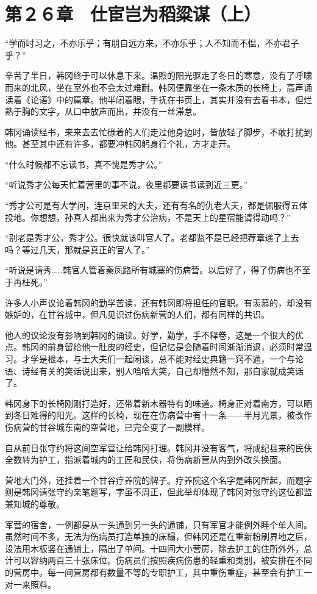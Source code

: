 \section{第２６章　仕宦岂为稻粱谋（上）}

“学而时习之，不亦乐乎；有朋自远方来，不亦乐乎；人不知而不愠，不亦君子乎？”

辛苦了半日，韩冈终于可以休息下来。温煦的阳光驱走了冬日的寒意，没有了呼啸而来的北风，坐在室外也不会太过难耐。韩冈便靠坐在一条木质的长椅上，高声诵读着《论语》中的篇章。他半闭着眼，手抚在书页上，其实并没有去看书本，但烂熟于胸的文字，从口中放声而出，并没有一丝滞怠。

韩冈诵读经书，来来去去忙碌着的人们走过他身边时，皆放轻了脚步，不敢打扰到他。甚至其中还有许多，都要冲韩冈躬身行个礼，方才走开。

“什么时候都不忘读书，真不愧是秀才公。”

“听说秀才公每天忙着营里的事不说，夜里都要读书读到近三更。”

“秀才公可是有大学问，连京里来的大夫，还有有名的仇老大夫，都是佩服得五体投地。你想想，孙真人都出来为秀才公治病，不是天上的星宿能请得动吗？”

“别老是秀才公，秀才公。很快就该叫官人了。老都监不是已经把荐章递了上去吗？等过几天，那就是真正的官人了。”

“听说是请秀……韩官人管着秦凤路所有城寨的伤病营。以后好了，得了伤病也不至于再枉死。”

许多人小声议论着韩冈的勤学苦读，还有韩冈即将担任的官职。有羡慕的，却没有嫉妒的，在甘谷城中，但凡见识过伤病新营的人们，都有同样的共识。

他人的议论没有影响到韩冈的诵读。好学，勤学，手不释卷，这是一个很大的优点。韩冈的前身留给他一肚皮的经史，但记忆是会随着时间渐渐消退，必须时常温习。才学是根本，与士大夫们一起闲谈，总不能对经史典籍一窍不通，一个与论语、诗经有关的笑话说出来，别人哈哈大笑，自己却懵然不知，那自家就成笑话了。

韩冈身下的长椅刚刚打造好，还带着新木器特有的味道。椅身正对着南方，可以晒到冬日难得的阳光。这样的长椅，现在在伤病营中有十一条——半月光景，被改作伤病营的甘谷城东南的空营地，已完全变了一副模样。

自从前日张守约将这间空军营让给韩冈打理。韩冈并没有客气，将成纪县来的民伕全数转为护工，指派着城内的工匠和民伕，将伤病新营从内到外改头换面。

营地大门外，还挂着一个甘谷疗养院的牌子。疗养院这个名字是韩冈所起，而题字则是韩冈请张守约亲笔题写，字虽不周正，但此举却体现了韩冈对张守约这位都监兼知城的尊敬。

军营的宿舍，一例都是从一头通到另一头的通铺，只有军官才能例外睡个单人间。虽然时间不多，无法为伤病员打造单独的床榻，但韩冈还是在重新粉刷界地之后，设法用木板竖在通铺上，隔出了单间。十四间大小营房，除去护工的住所外外，总计可以容纳两百三十张床位。伤病员们按照疾病伤患的轻重和类别，被安排在不同的营房中。每一间营房都有数量不等的专职护工，其中重伤重症，甚至会有护工一对一来照料。

